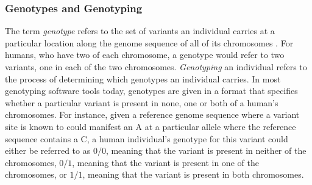 \subsubsection{Genotypes and Genotyping} \label{background:biology:genotype_and_genotyping}
The term \textit{genotype} refers to the set of variants an individual carries at a particular location along the genome sequence of all of its chromosomes \cite{nhgri_genotype}.
For humans, who have two of each chromosome, a genotype would refer to two variants, one in each of the two chromosomes.
\textit{Genotyping} an individual refers to the process of determining which genotypes an individual carries. 
In most genotyping software tools today, genotypes are given in a format that specifies whether a particular variant is present in none, one or both of a human's chromosomes.
For instance, given a reference genome sequence where a variant site is known to could manifest an A at a particular allele where the reference sequence contains a C, a human individual's genotype for this variant could either be referred to as $0/0$, meaning that the variant is present in neither of the chromosomes, $0/1$, meaning that the variant is present in one of the chromosomes, or $1/1$, meaning that the variant is present in both chromosomes.


